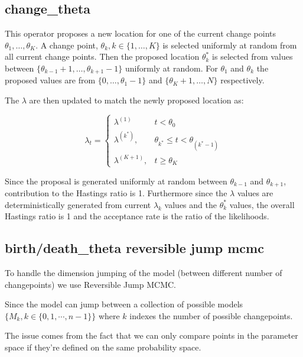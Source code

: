\documentclass[]{article}
\numberwithin{equation}{section}
\begin{document}
\hypertarget{change_theta}{%
\subsection{change\_theta}\label{change_theta}}

This operator proposes a new location for one of the current change
points \(\theta_1,\dots, \theta_K\). A change point,
\(\theta_k, k \in \{1, \dots, K\}\) is selected uniformly at random from
all current change points. Then the proposed location \(\theta_k^*\) is
selected from values between
\(\{\theta_{k-1}+1,\dots, \theta_{k+1}-1\}\) uniformly at random. For
\(\theta_1\) and \(\theta_k\) the proposed values are from
\(\{0,\dots, \theta_1-1\}\) and \(\{\theta_K+1,\dots, N\}\)
respectively.

The \(\lambda\) are then updated to match the newly proposed location
as:

\[ \lambda_t =  \begin{cases} \lambda^{(1)} & t < \theta_0 \\
\lambda^{(k^*)}, & \theta_{k^*} \leq t < \theta_{(k^*-1)} \\
\lambda^{(K+1)}, & t \geq \theta_K \end{cases}\]

Since the proposal is generated uniformly at random between
\(\theta_{k-1}\) and \(\theta_{k+1}\), contribution to the Hastings
ratio is 1. Furthermore since the \(\lambda\) values are
deterministically generated from current \(\lambda_k\) values and the
\(\theta_k^*\) values, the overall Hastings ratio is 1 and the
acceptance rate is the ratio of the likelihoods.

\hypertarget{birthdeath_theta-reversible-jump-mcmc}{%
\subsection{birth/death\_theta reversible jump
mcmc}\label{birthdeath_theta-reversible-jump-mcmc}}

To handle the dimension jumping of the model (between different number
of changepoints) we use Reversible Jump MCMC.

Since the model can jump between a collection of possible models
\(\{M_k, k \in \{0,1,\cdots,n-1\}\}\) where \(k\) indexes the number of
possible changepoints.

The issue comes from the fact that we can only compare points in the
parameter space if they're defined on the same probability space.
\end{document}
